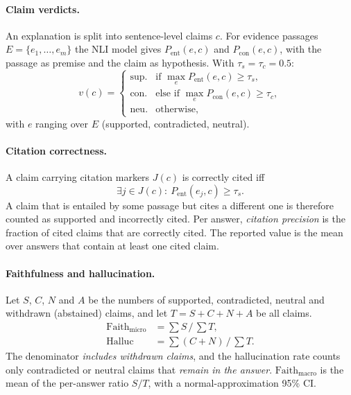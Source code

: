 \documentclass[11pt]{article}
\begin{document}
\paragraph{Claim verdicts.} An explanation is split into sentence-level claims $c$. For evidence passages $E=\{e_1,\dots,e_m\}$ the NLI model gives $P_{\text{ent}}(e,c)$ and $P_{\text{con}}(e,c)$, with the passage as premise and the claim as hypothesis. With $\tau_s=\tau_c=0.5$:
\begin{equation}
v(c)=\begin{cases}
\text{sup.} & \text{if } \max_{e}P_{\text{ent}}(e,c)\ge\tau_s,\\
\text{con.} & \text{else if } \max_{e}P_{\text{con}}(e,c)\ge\tau_c,\\
\text{neu.} & \text{otherwise,}
\end{cases}
\end{equation}
with $e$ ranging over $E$ (supported, contradicted, neutral).
\paragraph{Citation correctness.} A claim carrying citation markers $J(c)$ is correctly cited iff
\begin{equation}
\exists j\in J(c):\ P_{\text{ent}}(e_j,c)\ge\tau_s .
\end{equation}
A claim that is entailed by some passage but cites a different one is therefore counted as supported and incorrectly cited. Per answer, \emph{citation precision} is the fraction of cited claims that are correctly cited. The reported value is the mean over answers that contain at least one cited claim.

\paragraph{Faithfulness and hallucination.} Let $S$, $C$, $N$ and $A$ be the numbers of supported, contradicted, neutral and withdrawn (abstained) claims, and let $T=S+C+N+A$ be all claims.
\begin{align}
\mathrm{Faith}_{\text{micro}} &= \textstyle\sum S\,/\,\sum T,\\
\mathrm{Halluc} &= \textstyle\sum (C+N)\,/\,\sum T .
\end{align}
The denominator \emph{includes withdrawn claims}, and the hallucination rate counts only contradicted or neutral claims that \emph{remain in the answer}. $\mathrm{Faith}_{\text{macro}}$ is the mean of the per-answer ratio $S/T$, with a normal-approximation 95\% CI.
\end{document}

